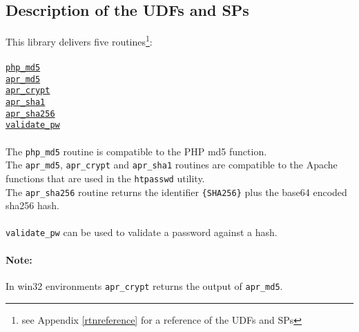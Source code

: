 \subsection{Description of the UDFs and SPs}
This library delivers five routines\footnote{see Appendix \ref{rtnreference} for a reference of the UDFs and SPs}:\\
\\
\hyperlink{hphpmd5}{\tt php\_md5}\\
\hyperlink{haprmd5}{\tt apr\_md5}\\
\hyperlink{haprcrypt}{\tt apr\_crypt}\\
\hyperlink{haprsha1}{\tt apr\_sha1}\\
\hyperlink{haprsha256}{\tt apr\_sha256}\\
\hyperlink{hvalidatepw}{\tt validate\_pw}\\
\\
The {\tt php\_md5} routine is compatible to the PHP md5 function.\\
The {\tt apr\_md5}, {\tt apr\_crypt} and {\tt apr\_sha1} routines are compatible to the Apache functions that are used in the {\tt htpasswd} utility.\\
The {\tt apr\_sha256} routine returns the identifier {\tt \{SHA256\}} plus the base64 encoded sha256 hash.\\
\\
{\tt validate\_pw} can be used to validate a password against a hash.
\paragraph{Note:}{In win32 environments {\tt apr\_crypt} returns the output of {\tt apr\_md5}.}